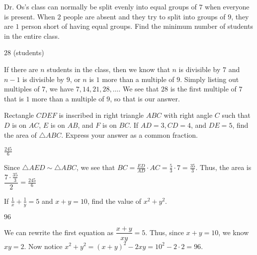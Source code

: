 \documentclass[11pt]{article}
\begin{document}
\begin{problem}
Dr. Os's class can normally be split evenly into equal groups of $7$ when everyone is present. When $2$ people are absent and they try to split into groups of $9$, they are $1$ person short of having equal groups. Find the minimum number of students in the entire class.
\end{problem}

\begin{answer}
$\boxed{28}$ (students)
\end{answer}

\begin{solution}
If there are $n$ students in the class, then we know that $n$ is divisible by $7$ and $n-1$ is divisible by $9$, or $n$ is $1$ more than a multiple of $9$. Simply listing out multiples of $7$, we have $7, 14, 21, 28, \ldots$. We see that $\boxed{28}$ is the first multiple of $7$ that is $1$ more than a multiple of $9$, so that is our answer.
\end{solution}


\begin{problem}%
Rectangle $CDEF$ is inscribed in right triangle $ABC$ with right angle $C$ such that $D$ is on $AC$, $E$ is on $AB$, and $F$ is on $BC$. If $AD=3, CD=4$, and $DE=5$, find the area of $\triangle ABC$. Express your answer as a common fraction.
\end{problem}

\begin{answer}
$\boxed{\frac{245}{6}}$
\end{answer}

\begin{solution}
Since $\triangle AED \sim \triangle ABC$, we see that $BC = \frac{ED}{AD} \cdot AC = \frac{5}{3} \cdot 7 = \frac{35}{3}$. Thus, the area is $\dfrac{7 \cdot \frac{35}{3}}{2} = \boxed{\frac{245}{6}}$
\end{solution}

\begin{problem}%
If $\frac{1}{x} + \frac{1}{y} = 5$ and $x+y=10$, find the value of $x^2+y^2$.
\end{problem}

\begin{answer}
$\boxed{96}$
\end{answer}

\begin{solution}
We can rewrite the first equation as $\dfrac{x+y}{xy} = 5$. Thus, since $x+y = 10$, we know $xy = 2$. Now notice $x^2+y^2 = (x+y)^2 - 2xy = 10^2 - 2 \cdot 2 = \boxed{96}$.
\end{solution}
\end{document}
